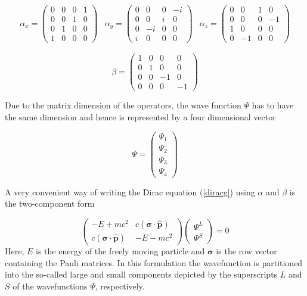 \begin{equation}\begin{array}{lll}
\alpha_x= \left(\begin{array}{cccc}
0 & 0 & 0 & 1\\
0 & 0 & 1 & 0\\
0 & 1 & 0 & 0\\
1 & 0 & 0 & 0\end{array}\right)&
\alpha_y = \left(\begin{array}{cccc}
0 & 0 & 0 & -i\\
0 & 0 & i & 0\\
0 & -i& 0 & 0\\
i & 0 & 0 & 0\end{array}\right)&
\alpha_z = \left(\begin{array}{cccc}
0 & 0 & 1 & 0\\
0 & 0 & 0 &-1\\
1 & 0 & 0 & 0\\
0 & -1& 0 & 0
\end{array}\right)
\end{array}\end{equation}

\begin{equation}
\beta = \left(\begin{array}{cccc}
1 & 0 & 0 & 0\\
0 & 1 & 0 & 0\\
0 & 0 &-1 & 0\\
0 & 0 & 0 &-1
\end{array}\right)
\end{equation}


Due to the matrix dimension of the operators, the wave function $\Psi$ has to have
the same dimension and hence is represented by a four dimensional vector

\begin{equation}
\Psi = \begin{pmatrix}
\Psi_1\\\Psi_2\\\Psi_3\\\Psi_4
\end{pmatrix}
\end{equation}

A very convenient way of writing the Dirac equation (\ref{diracg})
using $\alpha$ and $\beta$
is the two-component form

\begin{equation}\label{dirac2}
\left(\begin{array}{cc}
-E +mc^2 & c(\mathbf{\sigma}\cdot\hat{\mathbf{p}})\\
c(\mathbf{\sigma}\cdot\hat{\mathbf{p}}) & -E-mc^2
\end{array}\right)
\begin{pmatrix}\Psi^L\\\Psi^S\end{pmatrix}
=0
\end{equation}
Here, $E$ is the energy of the freely moving particle
and $\mathbf{\sigma}$ is the row vector
containing the Pauli matrices. In this formulation the wavefunction is partitioned
into the so-called large and small components depicted by the superscripts $L$ and
$S$ of the wavefunctions $\Psi$, respectively.

